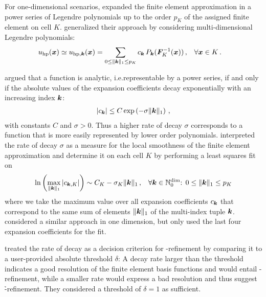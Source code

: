 For one-dimensional scenarios, \textcite{mavriplis1994} expanded the finite element approximation in a power series of Legendre polynomials up to the order $p_K$ of the assigned finite element on cell $K$. \textcites{houston2005}{eibner2007} generalized their approach by considering multi-dimensional Legendre polynomials:
\begin{align}
u_\text{hp} (\vec{x}) \simeq u_{\text{hp},\tuple{k}} (\vec{x}) &= \sum\limits_{0 \leq \|\tuple{k}\|_1 \leq p_K} c_\tuple{k} \, P_\tuple{k}(\mat{F}_K^{-1}(\vec{x})) \,\text{,} \quad \forall \vec{x} \in K \,\text{.}
\end{align}

\textcite[Prop.~2]{eibner2007} argued that a function is analytic, i.e.\@ representable by a power series, if and only if the absolute values of the expansion coefficients decay exponentially with an increasing index $\tuple{k}$:
\begin{align}
|c_\tuple{k}| \leq C \exp\left( - \sigma \|\tuple{k}\|_1\right) \,\text{,}
\end{align}
with constants $C$ and $\sigma > 0$. Thus a higher rate of decay $\sigma$ corresponds to a function that is more easily represented by lower order polynomials. \textcites[Sec.~2.4]{houston2005}[Ch.~4]{eibner2007} interpreted the rate of decay $\sigma$ as a measure for the local smoothness of the finite element approximation and determine it on each cell $K$ by performing a least squares fit on
\begin{align}
\ln \left( \max\limits_{\|\tuple{k}\|_1} |c_{\tuple{k},K}| \right) \sim C_K - \sigma_K \|\tuple{k}\|_1 \,\text{,} \quad \forall \tuple{k} \in \mathbb{N}_0^\text{dim} \text{: } 0 \leq \|\tuple{k}\|_1 \leq p_K
\end{align}
where we take the maximum value over all expansion coefficients $c_\tuple{k}$ that correspond to the same sum of elements $\|\tuple{k}\|_1$ of the multi-index tuple $\tuple{k}$. \textcite{mavriplis1994} considered a similar approach in one dimension, but only used the last four expansion coefficients for the fit.

\textcite{mavriplis1994, eibner2007} treated the rate of decay as a decision criterion for \hp-refinement by comparing it to a user-provided absolute threshold $\delta$: A decay rate larger than the threshold indicates a good resolution of the finite element basis functions and would entail \p-refinement, while a smaller rate would express a bad resolution and thus suggest \h-refinement. They considered a threshold of $\delta = 1$ as sufficient.

